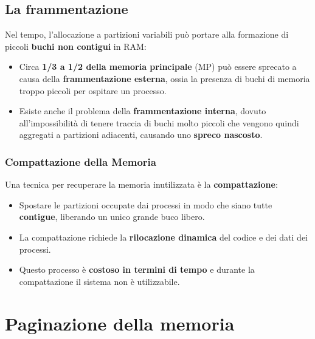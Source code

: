\subsection{La frammentazione}
Nel tempo, l'allocazione a partizioni variabili può portare alla formazione di piccoli \textbf{buchi non contigui} in RAM:
\begin{itemize}
    \item Circa \textbf{1/3 a 1/2 della memoria principale} (MP) può essere sprecato a causa della \textbf{frammentazione esterna}, ossia la presenza di buchi di memoria troppo piccoli per ospitare un processo.
    \item Esiste anche il problema della \textbf{frammentazione interna}, dovuto all'impossibilità di tenere traccia di buchi molto piccoli che vengono quindi aggregati a partizioni adiacenti, causando uno \textbf{spreco nascosto}.
\end{itemize}

\subsubsection*{Compattazione della Memoria}

Una tecnica per recuperare la memoria inutilizzata è la \textbf{compattazione}:
\begin{itemize}
    \item Spostare le partizioni occupate dai processi in modo che siano tutte \textbf{contigue}, liberando un unico grande buco libero.
    \item La compattazione richiede la \textbf{rilocazione dinamica} del codice e dei dati dei processi.
    \item Questo processo è \textbf{costoso in termini di tempo} e durante la compattazione il sistema non è utilizzabile.
\end{itemize}

\section{Paginazione della memoria}

